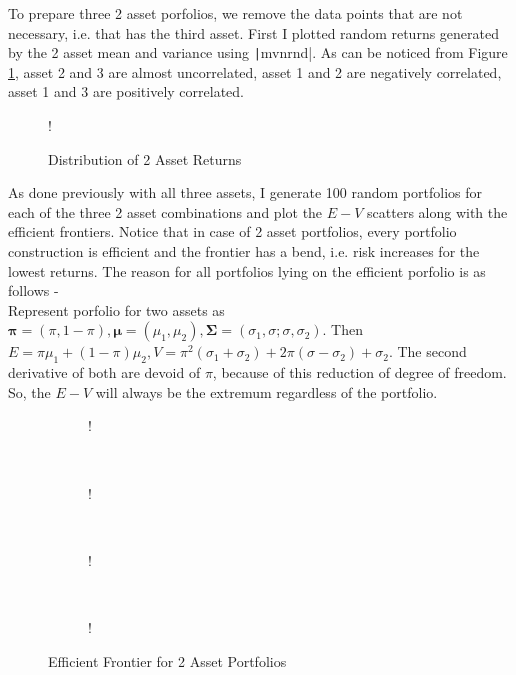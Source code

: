 \documentclass[11pt]{article}
\begin{document}
To prepare three 2 asset porfolios, we remove the data points that are not necessary, i.e. that has
the third asset. First I plotted random returns generated by the 2 asset mean and variance using
\texttt|mvnrnd|. As can be noticed from Figure \ref{fig:q1-b-return-distribution}, asset
2 and 3 are almost uncorrelated, asset 1 and 2 are negatively correlated, asset 1 and 3 are positively
correlated.\\

\begin{figure}[!h]
	\vspace{-0.5cm}
	\centering 
	 {!} { }
	\caption{Distribution of 2 Asset Returns}
	\label{fig:q1-b-return-distribution}
	\vspace{-0.5cm}
\end{figure}

As done previously with all three assets, I generate 100 random portfolios for each of the three 2 asset
combinations and plot the $E-V$ scatters along with the efficient frontiers. Notice that in case of 2 asset portfolios, every portfolio construction is efficient and the frontier
has a bend, i.e. risk increases for the lowest returns. The reason for all portfolios lying on the efficient porfolio
is as follows - \\

Represent porfolio for two assets as $\bm{\pi} = (\pi, 1-\pi), \bm{\mu} = (\mu_1, \mu_2), \bm{\Sigma}=(\sigma_1, \sigma; \sigma, \sigma_2)$.
Then $E = \pi\mu_1 + (1-\pi)\mu_2, V = \pi^2(\sigma_1 + \sigma_2) +2\pi(\sigma - \sigma_2) + \sigma_2$. The second derivative
of both are devoid of $\pi$, because of this reduction of degree of freedom. So, the $E-V$ will always be the extremum
regardless of the portfolio.

\begin{figure}[!h]
   \centering 
   \begin{subfigure}[b]{0.23\textwidth}
     	\resizebox {\textwidth} {!} { }
		\label{fig:q1-b-efficient-frontier-1}
    \end{subfigure}
    ~
    \begin{subfigure}[b]{0.23\textwidth}
       	\resizebox {\textwidth} {!} { }
        \label{fig:q1-b-efficient-frontier-2}
    \end{subfigure}
	~
    \begin{subfigure}[b]{0.23\textwidth}
       	\resizebox {\textwidth} {!} { }
        \label{fig:q1-b-efficient-frontier-3}
    \end{subfigure}
	~
    \begin{subfigure}[b]{0.23\textwidth}
       	\resizebox {\textwidth} {!} { }
        \label{fig:q1-b-efficient-frontier-all}
    \end{subfigure}
	\vspace{-0.5cm}
    \caption{Efficient Frontier for 2 Asset Portfolios}\label{fig:naive_v_cvx}
\end{figure}
\end{document}
